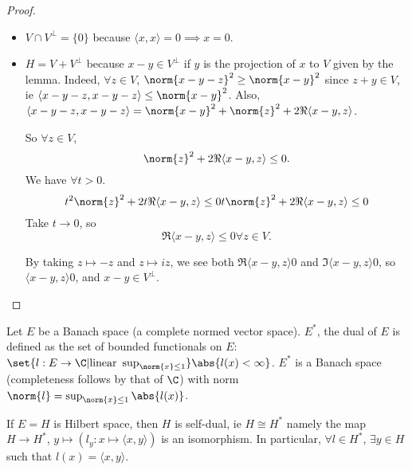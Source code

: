 \documentclass{article}
\newcommand{\1}[1]{\mathbbm{1}_{#1}}
\begin{document}
\begin{proof}
    \leavevmode
    \begin{itemize}
        \item $V \cap V^\bot = \{0\}$ because $\langle x, x \rangle = 0 \implies x = 0$.
        \item $H = V + V^\bot$ because $x - y \in V^\bot$ if $y$ is the projection of $x$ to $V$ given by the lemma.
            Indeed, $\forall z \in V$, $\norm{x - y - z}^2 \geq \norm{x - y}^2$ since $z + y \in V$, ie $\langle x - y - z, x - y - z \rangle \leq \norm{x - y}^2$.
            Also, $\langle x - y - z, x - y - z \rangle = \norm{x - y}^2    + \norm{z}^2 + 2 \Re \langle x - y, z \rangle$.

            So $\forall z \in V$,
            \begin{equation*}
                \norm{z}^2 + 2 \Re \langle x - y, z \rangle \leq 0.
            \end{equation*}
            We have $\forall t > 0$.
            \begin{equation*}
                t^2 \norm{z}^2 + 2 t \Re \langle x - y, z \rangle \leq 0 \\
                t \norm{z}^2 + 2 \Re \langle x - y, z \rangle \leq 0
            \end{equation*}
            Take $t \to 0$, so
            \begin{equation*}
                \Re \langle x - y, z \rangle \leq 0 \forall z \in V.
            \end{equation*}

            By taking $z \mapsto -z$ and $z \mapsto iz$, we see both $\Re \langle x - y, z \rangle 0$ and $\Im \langle x - y, z \rangle 0$, so $\langle x - y, z \rangle 0$, and $x - y \in V^\bot$.
    \end{itemize}
\end{proof}

Let $E$ be a Banach space (a complete normed vector space).
$E^*$, the dual of $E$ is defined as the set of bounded functionals on $E$: $\set{l: E \to \C | \text{linear } \sup_{\norm{x} \leq 1}} \abs{l(x) < \infty}$.
$E^*$ is a Banach space (completeness follows by that of $\C$) with norm $\norm{l} = \sup_{\norm{x} \leq 1} \abs{l(x)}$.

\begin{prop}
    If $E = H$ is Hilbert space, then $H$ is self-dual, ie $H \cong H^*$ namely the map $H \to H^*$, $y \mapsto (l_y: x \mapsto \langle x, y \rangle)$ is an isomorphism.
    In particular, $\forall l \in H^*$, $\exists y \in H$ such that $l(x) = \langle x, y \rangle$.
\end{prop}
\end{document}
